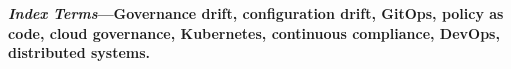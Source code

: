 \documentclass[10pt,twocolumn]{article}
\theoremstyle{ieeedef}
\begin{document}
\vspace{4pt}
\noindent\textbf{\textit{Index Terms}---Governance drift, configuration drift, GitOps, policy as code, cloud governance, Kubernetes, continuous compliance, DevOps, distributed systems.}
\vspace{8pt}











\ifanonymoussubmission
  
\else
  
\fi




\end{document}
